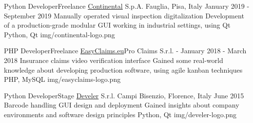 \begin{cventries}
  \logocventry
    {Python Developer{\enskip\cdotp\enskip}Freelance}
    {\href{https://www.continental-pneumatici.it/auto}{Continental} S.p.A.}
    {Fauglia, Pisa, Italy}
    {January 2019 - September 2019}
    {
      \cvexp
        {Manually operated visual inspection digitalization}
        {Development of a production-grade modular GUI working in industrial settings, using Qt}
        {Python, Qt}
    }
    {img/continental-logo.png}

  \logocventry
    {PHP Developer{\enskip\cdotp\enskip}Freelance}
    {\href{https://www.easyclaims.eu}{EasyClaims.eu}{\enskip\cdotp\enskip}Pro Claims S.r.l.}
    {-}
    {January 2018 - March 2018}
    {
      \cvexp
        {Insurance claims video verification interface}
        {Gained some real-world knowledge about developing production software, using agile kanban techniques}
        {PHP, MySQL}
    }
    {img/easyclaims-logo.png}

  \logocventry
    {Python Developer{\enskip\cdotp\enskip}Stage}
    {\href{https://www.develer.com/}{Develer} S.r.l.}
    {Campi Bisenzio, Florence, Italy}
    {June 2015}
    {
      \cvexp
        {Barcode handling GUI design and deployment}
        {Gained insights about company environments and software design principles}
        {Python, Qt}
    }
    {img/develer-logo.png}

\end{cventries}

